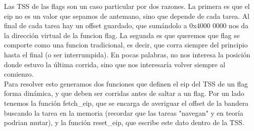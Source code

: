 Las TSS de las flags son un caso particular por dos razones. La primera es que el eip no es un valor que sepamos de antemano, sino que 
depende de cada tarea. Al final de cada tarea hay un offset guardado, que sum\'andolo a 0x4000 0000 nos da la direcci\'on virtual 
de la funcion flag. La segunda es que queremos que flag se comporte como una funcion tradicional, es decir, que corra siempre del 
principio hasta el final (o ser interrumpida). En pocas palabras, no nos interesa la posici\'on donde estuvo la \'ultima corrida, sino
que nos interesar\'ia volver siempre al comienzo.\\
Para resolver esto generamos dos funciones que definen el eip del TSS de un flag forma din\'amica, y que deben ser corridas antes de 
saltar a un flag. Por un lado tenemos la funci\'on fetch\_eip, que se encarga de averiguar el offset de la bandera buscando la tarea 
en la memoria (recordar que las tareas "navegan" y en teor\'ia podrian mutar), y la funci\'on reset\_eip, que escribe este dato dentro 
de la TSS.\\
